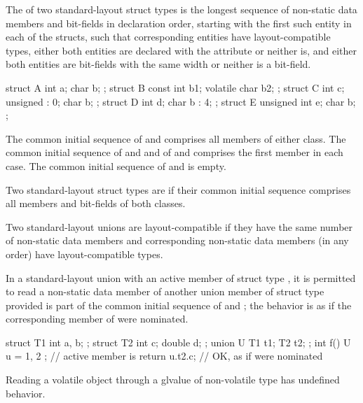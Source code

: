 \pnum
The  of two standard-layout struct
types is the longest sequence of non-static data
members and bit-fields in declaration order, starting with the first
such entity in each of the structs, such that corresponding entities
have layout-compatible types,
either both entities are declared with
the  attribute
or neither is,
and either both entities are bit-fields with the same width
or neither is a bit-field.
\begin{example}
\begin{codeblock}
struct A { int a; char b; };
struct B { const int b1; volatile char b2; };
struct C { int c; unsigned : 0; char b; };
struct D { int d; char b : 4; };
struct E { unsigned int e; char b; };
\end{codeblock}
The common initial sequence of  and  comprises all members
of either class. The common initial sequence of  and  and
of  and  comprises the first member in each case.
The common initial sequence of  and  is empty.
\end{example}

\pnum
Two standard-layout struct types are
 if
their common initial sequence comprises all members and bit-fields of
both classes.

\pnum
Two standard-layout unions are layout-compatible if they
have the same number of non-static data members and corresponding
non-static data members (in any order) have layout-compatible
types.

\pnum
In a standard-layout union with an active member
of struct type , it is permitted to read a non-static
data member  of another union member of struct type 
provided  is part of the common initial sequence of  and ;
the behavior is as if the corresponding member of  were nominated.
\begin{example}
\begin{codeblock}
struct T1 { int a, b; };
struct T2 { int c; double d; };
union U { T1 t1; T2 t2; };
int f() {
  U u = { { 1, 2 } };   // active member is 
  return u.t2.c;        // OK, as if  were nominated
}
\end{codeblock}
\end{example}
\begin{note}
Reading a volatile object through a glvalue of non-volatile type has
undefined behavior.
\end{note}

